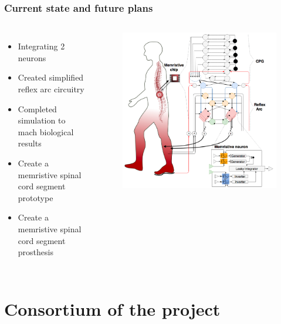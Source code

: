 \documentclass[12pt, aspectratio=169]{beamer}
\begin{document}
\begin{frame}
  \frametitle{Current state and future plans}
\begin{columns}[c]

\begin{itemize}
\item Integrating 2 neurons
\item Created simplified reflex arc circuitry
\item Completed simulation to mach biological results
\item Create a memristive spinal cord segment prototype
\item Create a memristive spinal cord segment prosthesis
\end{itemize}
\begin{figure}
\includegraphics[width=1.0\linewidth]{MemArc_logo}
\end{figure}
\end{columns}
\end{frame}

\section{Consortium of the project}
\end{document}
